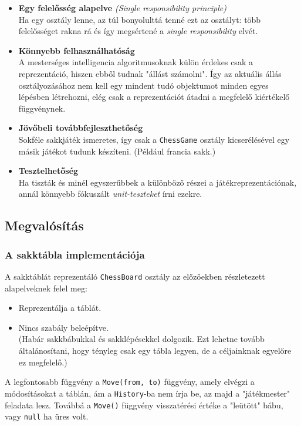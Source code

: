 \documentclass[twoside, a4paper, 12pt]{article}
\begin{document}
\begin{itemize}
	\item \textbf{Egy felelősség alapelve} \textit{(Single responsibility principle)}\cite{SingleResponsibilityHu}~\cite{SingleResponsibilityEn}~\cite{SOLID}~ \\
	Ha egy osztály lenne, az túl bonyolulttá tenné ezt az osztályt: több felelősséget rakna rá és így megsértené a \textit{single responsibility} elvét.
	\item \textbf{Könnyebb felhasználhatóság} \\
	A mesterséges intelligencia algoritmusoknak külön érdekes csak a reprezentáció, hiszen ebből tudnak "állást számolni". Így az aktuális állás osztályozásához nem kell egy mindent tudó objektumot minden egyes lépésben létrehozni, elég csak a reprezentációt átadni a megfelelő kiértékelő függvénynek.
	\item \textbf{Jövőbeli továbbfejleszthetőség} \\
	Sokféle sakkjáték ismeretes, így csak a \texttt{ChessGame} osztály kicserélésével egy másik játékot tudunk készíteni. (Például francia sakk.)
	\item \textbf{Tesztelhetőség} \\
	Ha tiszták és minél egyszerűbbek a különböző részei a játékreprezentációnak, annál könnyebb fókuszált \textit{unit-teszteket} írni ezekre.
\end{itemize}

\subsection{Megvalósítás}

\subsubsection{A sakktábla implementációja}
A sakktáblát reprezentáló \texttt{ChessBoard} osztály az előzőekben részletezett alapelveknek felel meg:
\begin{itemize}
	\item Reprezentálja a táblát.
	\item Nincs szabály beleépítve. \\ 
	(Habár sakkbábukkal és sakklépésekkel dolgozik. Ezt lehetne tovább általánosítani, hogy tényleg csak egy tábla legyen, de a céljainknak egyelőre ez megfelelő.)
\end{itemize}

A legfontosabb függvény a \texttt{Move(from, to)} függvény, amely elvégzi a módosításokat a táblán, ám a \texttt{History}-ba nem írja be, az majd a "játékmester" feladata lesz. Továbbá a \texttt{Move()} függvény visszatérési értéke a "leütött" bábu, vagy \texttt{null} ha üres volt.
\end{document}
